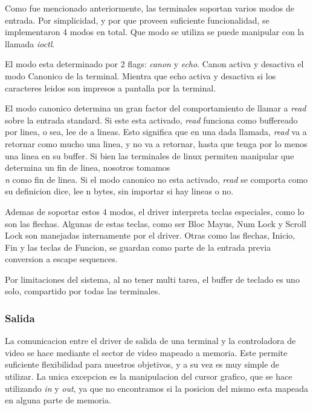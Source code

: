 \documentclass[a4paper,10pt]{article}
\begin{document}
            Como fue mencionado anteriormente, las terminales soportan varios modos de entrada.
            Por simplicidad, y por que proveen suficiente funcionalidad, se implementaron 4 modos en total.
            Que modo se utiliza se puede manipular con la llamada \textit{ioctl}.

            El modo esta determinado por 2 flags: \textit{canon} y \textit{echo}.
            Canon activa y desactiva el modo Canonico de la terminal.
            Mientra que echo activa y desactiva si los caracteres leidos son impresos a pantalla por la terminal.

            El modo canonico determina un gran factor del comportamiento de llamar a \textit{read} sobre la entrada standard.
            Si este esta activado, \textit{read} funciona como buffereado por linea, o sea, lee de a lineas.
            Esto significa que en una dada llamada, \textit{read} va a retornar como mucho una linea, y no va a retornar, hasta que tenga por lo menos una linea en su buffer.
            Si bien las terminales de linux permiten manipular que determina un fin de linea, nosotros tomamos \textit{\\n} como fin de linea.
            Si el modo canonico no esta activado, \textit{read} se comporta como su definicion dice, lee n bytes, sin importar si hay lineas o no.

            Ademas de soportar estos 4 modos, el driver interpreta teclas especiales, como lo son las flechas.
            Algunas de estas teclas, como ser Bloc Mayus, Num Lock y Scroll Lock son manejadas internamente por el driver.
            Otras como las flechas, Inicio, Fin y las teclas de Funcion, se guardan como parte de la entrada previa conversion a escape sequences.

            Por limitaciones del sistema, al no tener multi tarea, el buffer de teclado es uno solo, compartido por todas las terminales.

        \subsubsection{Salida}
            La comunicacion entre el driver de salida de una terminal y la controladora de video se hace mediante el sector de video mapeado a memoria.
            Este permite suficiente flexibilidad para nuestros objetivos, y a su vez es muy simple de utilizar.
            La unica excepcion es la manipulacion del cursor grafico, que se hace utilizando \textit{in} y \textit{out}, ya que no encontramos si la posicion del mismo esta mapeada en alguna parte de memoria.
\end{document}
